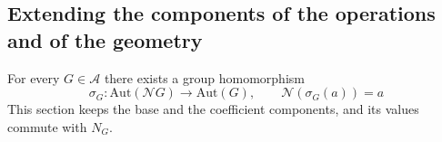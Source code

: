 \subsection*{Extending the components of the operations and of the geometry}

\begin{lemma}\label{lem:7.18}

For every $G\in\mathcal A$ there exists a group homomorphism
\begin{equation*}
\sigma_G:\mathrm{Aut}(\mathcal N G)\longrightarrow\mathrm{Aut}(G),
\qquad \mathcal N(\sigma_G(a))=a
\tag{7.27}\label{eq:7.27}
\end{equation*}
This section keeps the base and the coefficient components, and its values commute with
$N_G$.

\end{lemma}

